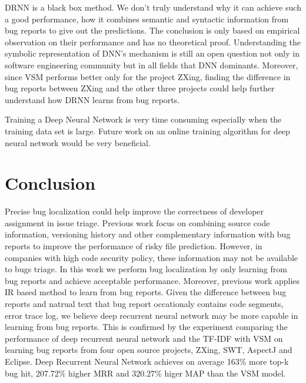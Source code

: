 DRNN is a black box method. 
We don't truly understand why it can achieve such a good performance, how it combines semantic and syntactic information from bug reports to give out the predictions.
The conclusion is only based on empirical observation on their performance and has no theoretical proof.
Understanding the symbolic representation of DNN's mechanism is still an open question not only in software engineering community but in all fields that DNN dominants.   
Moreover, since VSM performs better only for the project ZXing, finding the difference in bug reports between ZXing and the other three projects could help further understand how DRNN learns from bug reports. 

Training a Deep Neural Network is very time consuming especially when the training data set is large. 
Future work on an online training algorithm for deep neural network would be very beneficial.

\section{Conclusion}

Precise bug localization could help improve the correctness of developer assignment in issue triage.
Previous work focus on combining source code information, versioning history and other complementary information with bug reports to improve the performance of risky file prediction.
However, in companies with high code security policy, these information may not be available to bugs triage.
In this work we perform bug localization by only learning from  bug reports and achieve acceptable performance. 
Moreover, previous work applies IR based method to learn from bug reports. 
Given the difference between bug reports and natrual text that bug report occationaly contains code segments, error trace log, 
we believe deep recurrent neural network may be more capable in learning from bug reports.
This is confirmed by the experiment comparing the performance of deep recurrent neural network and the TF-IDF with VSM on learning bug reports from four open source projects,
ZXing, SWT, AspectJ and Eclipse. 
Deep Recurrent Neural Network achieves on average 163\% more top-k bug hit, 207.72\% higher MRR and 320.27\% higer MAP than the VSM model. 





	 
